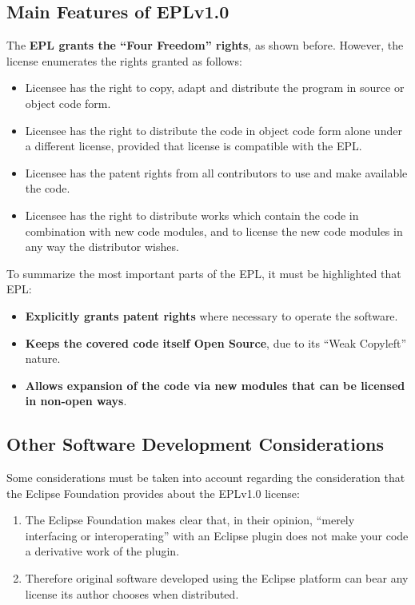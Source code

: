 \documentclass[a4paper, 12pt]{book}
\begin{document}
\subsection{Main Features of EPLv1.0}
The \textbf{EPL grants the ``Four Freedom'' rights}, as shown before. However, the license enumerates the rights granted as follows:
\begin{itemize}\itemsep0pt
 \item{Licensee has the right to copy, adapt and distribute the program in source or object code form}.
 \item{Licensee has the right to distribute the code in object code form alone under a different license, provided that license is compatible with the EPL}.
 \item{Licensee has the patent rights from all contributors to use and make available the code}.
  \item{Licensee has the right to distribute works which contain the code in combination with new code modules, and to license the new code modules in any way the distributor wishes}.
\end{itemize}

To summarize the most important parts of the EPL, it must be highlighted that EPL:
\begin{itemize}\itemsep0pt
 \item{\textbf{Explicitly grants patent rights} where necessary to operate the software}.
 \item{\textbf{Keeps the covered code itself Open Source}}, due to its ``Weak Copyleft'' nature.
 \item{\textbf{Allows expansion of the code via new modules that can be licensed in non-open ways}}.
\end{itemize}\itemsep0pt

\subsection{Other Software Development Considerations}
Some considerations must be taken into account regarding the consideration that the Eclipse Foundation provides about the EPLv1.0 license:
\begin{enumerate}
 \item{The Eclipse Foundation makes clear that, in their opinion, ``merely interfacing or interoperating'' with an Eclipse plugin does not make your code a derivative work of the plugin}.
 \item{Therefore original software developed using the Eclipse platform can bear any license its author chooses when distributed}.
\end{enumerate}
\end{document}

